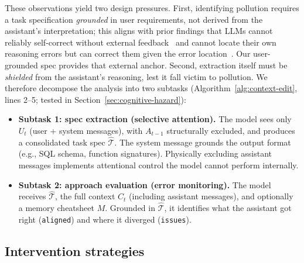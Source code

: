 \documentclass{article}
\begin{document}
These observations yield two design pressures. First, identifying pollution requires a task specification \emph{grounded} in user requirements, not derived from the assistant's interpretation; this aligns with prior findings that LLMs cannot reliably self-correct without external feedback~\citep{kamoi2024criticalselfcorrect} and cannot locate their own reasoning errors but can correct them given the error location~\citep{tyen2024errors}. Our user-grounded spec provides that external anchor. Second, extraction itself must be \emph{shielded} from the assistant's reasoning, lest it fall victim to pollution. We therefore decompose the analysis into two subtasks (Algorithm~\ref{alg:context-edit}, lines 2--5; tested in Section~\ref{sec:cognitive-hazard}):
\begin{itemize}[leftmargin=*, topsep=2pt, itemsep=1pt, parsep=0pt]
    \item \textbf{Subtask 1: spec extraction (selective attention).} The model sees only $U_t$ (user + system messages), with $A_{t-1}$ structurally excluded, and produces a consolidated task spec $\hat{\mathcal{T}}$. The system message grounds the output format (e.g., SQL schema, function signatures). Physically excluding assistant messages implements attentional control the model cannot perform internally.
    \item \textbf{Subtask 2: approach evaluation (error monitoring).} The model receives $\hat{\mathcal{T}}$, the full context $C_t$ (including assistant messages), and optionally a memory cheatsheet $M$. Grounded in $\hat{\mathcal{T}}$, it identifies what the assistant got right (\texttt{aligned}) and where it diverged (\texttt{issues}).
\end{itemize}

\subsection{Intervention strategies}
\label{sec:strategies}
\end{document}
